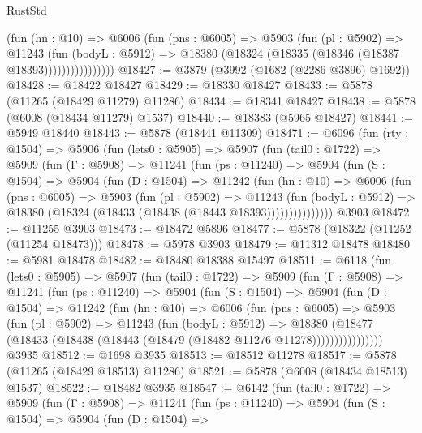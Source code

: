 \begin{lexlean}{RustStd}
\begin{coremodule}
                    (fun (hn : @10) =>
                    @6006
                      (fun (pns : @6005) =>
                      @5903
                        (fun (pl : @5902) =>
                        @11243
                          (fun (bodyL : @5912) =>
                          @18380 (@18324 (@18335 (@18346 (@18387 @18393))))))))))))))))
@18427 := @3879 (@3992 (@1682 (@2286 @3896) @1692))
@18428 := @18422 @18427
@18429 := @18330 @18427
@18433 := @5878 (@11265 (@18429 @11279) @11286)
@18434 := @18341 @18427
@18438 := @5878 (@6008 (@18434 @11279) @1537)
@18440 := @18383 (@5965 @18427)
@18441 := @5949 @18440
@18443 := @5878 (@18441 @11309)
@18471 := @6096
    (fun (rty : @1504) =>
    @5906
      (fun (lets0 : @5905) =>
      @5907
        (fun (tail0 : @1722) =>
        @5909
          (fun (Γ : @5908) =>
          @11241
            (fun (ps : @11240) =>
            @5904
              (fun (S : @1504) =>
              @5904
                (fun (D : @1504) =>
                @11242
                  (fun (hn : @10) =>
                  @6006
                    (fun (pns : @6005) =>
                    @5903
                      (fun (pl : @5902) =>
                      @11243
                        (fun (bodyL : @5912) =>
                        @18380 (@18324 (@18433 (@18438 (@18443 @18393)))))))))))))))
    @3903
@18472 := @11255 @3903
@18473 := @18472 @5896
@18477 := @5878 (@18322 (@11252 (@11254 @18473)))
@18478 := @5978 @3903
@18479 := @11312 @18478
@18480 := @5981 @18478
@18482 := @18480 @18388 @15497
@18511 := @6118
    (fun (lets0 : @5905) =>
    @5907
      (fun (tail0 : @1722) =>
      @5909
        (fun (Γ : @5908) =>
        @11241
          (fun (ps : @11240) =>
          @5904
            (fun (S : @1504) =>
            @5904
              (fun (D : @1504) =>
              @11242
                (fun (hn : @10) =>
                @6006
                  (fun (pns : @6005) =>
                  @5903
                    (fun (pl : @5902) =>
                    @11243
                      (fun (bodyL : @5912) =>
                      @18380
                        (@18477
                          (@18433 (@18438 (@18443 (@18479 (@18482 @11276 @11278))))))))))))))))
    @3935
@18512 := @1698 @3935
@18513 := @18512 @11278
@18517 := @5878 (@11265 (@18429 @18513) @11286)
@18521 := @5878 (@6008 (@18434 @18513) @1537)
@18522 := @18482 @3935
@18547 := @6142
    (fun (tail0 : @1722) =>
    @5909
      (fun (Γ : @5908) =>
      @11241
        (fun (ps : @11240) =>
        @5904
          (fun (S : @1504) =>
          @5904
            (fun (D : @1504) =>

\end{coremodule}
\end{lexlean}
